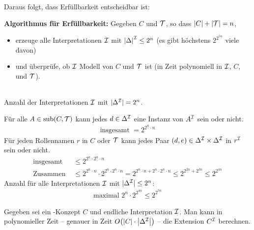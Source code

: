Daraus folgt, dass Erfüllbarkeit entscheidbar ist:

\textbf{Algorithmus für Erfüllbarkeit:}
Gegeben $C$ und $\mathcal{T}$, so dass $|C|+|\mathcal{T}| = n$,
\begin{itemize} 
  \item erzeuge alle Interpretationen $\mathcal{I}$ mit $\left| \Delta \right|^\MI \leq 2^{n}$ (es gibt höchstens $2^{2^{5n}}$ viele davon) 
  \item und überprüfe, ob $\mathcal{I}$ Modell von $C$ und $\mathcal{T}$ ist (in Zeit polynomiell in $\mathcal{I}$, $C$, und $\mathcal{T}$).
\end{itemize}

\begin{tafel}\mbox{}\\
    Anzahl der Interpretationen $\mathcal{I}$ mit $|\Delta^{\mathcal{I}}| = 2^n$.
    
    Für alle $A \in \operatorname{sub}(C, \mathcal{T})$ kann jedes $d \in \Delta^{\mathcal{I}}$ eine Instanz von $A^{\mathcal{I}}$ sein oder nicht.
    \begin{align*}
        \text{insgesamt } = 2^{2^{n} \cdot n}
    \end{align*}
    Für jeden Rollennamen $r$ in $C$ oder $\mathcal{T}$ kann jedes Paar $(d, e) \in \Delta^{\mathcal{I}} \times \Delta^{\mathcal{I}}$ in $r^{\mathcal{I}}$ sein oder nicht.
    \begin{align*}
        \text{insgesamt } &\leq 2^{2^n \cdot 2^n \cdot n}\\
        \text{Zusammen } &\leq 2^{2^n \cdot n} \cdot 2^{2^n \cdot 2^n \cdot n} = 2^{2^n \cdot n + 2^n \cdot 2^n \cdot n} \leq 2^{2^{2n} + 2^{3n}} \leq 2^{2^{4n}}
    \end{align*}
    Anzahl für alle Interpretationen $\mathcal{I}$ mit $|\Delta^{\mathcal{I}}| \leq 2^n$:
    \begin{align*}
        \text{maximal } 2^n \cdot 2^{2^{4n}} \leq 2^{2^{5n}}
    \end{align*}
\end{tafel}

\begin{lemma}
    \label{lem:extensionsberechnung}
Gegeben sei ein \ALC-Konzept $C$ und endliche Interpretation $\mathcal{I}$. Man kann in polynomieller Zeit -- genauer in Zeit $O\left( \left| C \right| \cdot \left| \Delta^\MI \right| \right)$ -- die Extension $C^{\mathcal{I}}$ berechnen.
\end{lemma}

